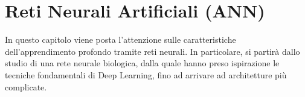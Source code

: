 \chapter{Reti Neurali Artificiali (ANN)}
In questo capitolo viene posta l’attenzione sulle caratteristiche dell’apprendimento 
profondo tramite reti neurali. In particolare, si partirà dallo studio
 di una rete neurale biologica, dalla quale hanno preso ispirazione le tecniche
 fondamentali di Deep Learning, fino ad arrivare ad architetture più complicate.